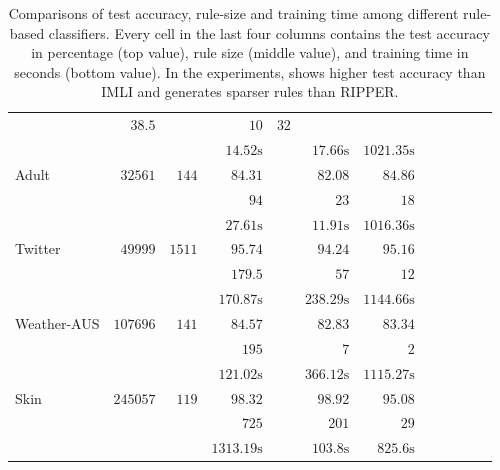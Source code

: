 \begin{table}[b]
\begin{center}
\begin{tabular}{l  r  r r r r r r r rrr}
			& $   38.5  $    &       & $   10 $    & $   32 $   \\[0.05cm] & & 
			& $   14.52 \text{s}  $    &       & $   17.66 \text{s}  $    & $   1021.35 \text{s}  $   \\[.3cm] 
			{ Adult}   & $  32561 $  & $  144 $  & $   84.31  $    &   \multicolumn{1}{c}{\multirow{3}{*}{\textemdash}}       & $   82.08  $    & $   84.86  $   \\[0.05cm] & & 
			& $   94 $    &       & $   23 $    & $   18 $   \\[0.05cm] & & 
			& $   27.61 \text{s}  $    &       & $   11.91 \text{s}  $    & $   1016.36 \text{s}  $   \\[.3cm] 
			{ Twitter}   & $  49999 $  & $  1511 $  & $   95.74  $    &   \multicolumn{1}{c}{\multirow{3}{*}{\textemdash}}       & $   94.24  $    & $   95.16  $   \\[0.05cm] & & 
			& $   179.5  $    &       & $   57 $    & $   12 $   \\[0.05cm] & & 
			& $   170.87 \text{s}  $    &       & $   238.29 \text{s}  $    & $   1144.66 \text{s}  $   \\[.3cm] 
			{ Weather-AUS}   & $  107696 $  & $  141 $  & $   84.57  $    &   \multicolumn{1}{c}{\multirow{3}{*}{\textemdash}}       & $   82.83  $    & $   83.34  $   \\[0.05cm] & & 
			& $   195 $    &       & $   7 $    & $   2 $   \\[0.05cm] & & 
			& $   121.02 \text{s}  $    &       & $   366.12 \text{s}  $    & $   1115.27 \text{s}  $   \\[.3cm] 
			{ Skin}   & $  245057 $  & $  119 $  & $   98.32  $    &   \multicolumn{1}{c}{\multirow{3}{*}{\textemdash}}       & $   98.92  $    & $   95.08  $   \\[0.05cm] & & 
			& $   725 $    &       & $   201 $    & $   29 $   \\[0.05cm] & & 
			& $   1313.19 \text{s}  $    &       & $   103.8 \text{s}  $    & $   825.6 \text{s}  $   \\[.3cm] 
			\bottomrule
		\end{tabular}
	\end{center}
	\caption{Comparisons of test accuracy, rule-size and training time among different rule-based classifiers. Every cell in the last four columns contains the test accuracy in percentage (top value), rule size  (middle value), and  training time in seconds (bottom value). In the experiments, {\crr} shows higher test accuracy than IMLI and generates sparser rules than RIPPER.}
	\label{interpretability_crr_tab:rule_based_classifiers}
\end{table}



